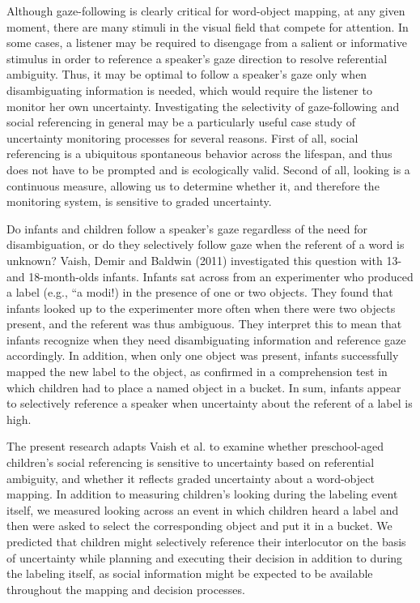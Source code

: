 \documentclass[10pt, letterpaper]{article}
\begin{document}
Although gaze-following is clearly critical for word-object mapping, at
any given moment, there are many stimuli in the visual field that
compete for attention. In some cases, a listener may be required to
disengage from a salient or informative stimulus in order to reference a
speaker's gaze direction to resolve referential ambiguity. Thus, it may
be optimal to follow a speaker's gaze only when disambiguating
information is needed, which would require the listener to monitor her
own uncertainty. Investigating the selectivity of gaze-following and
social referencing in general may be a particularly useful case study of
uncertainty monitoring processes for several reasons. First of all,
social referencing is a ubiquitous spontaneous behavior across the
lifespan, and thus does not have to be prompted and is ecologically
valid. Second of all, looking is a continuous measure, allowing us to
determine whether it, and therefore the monitoring system, is sensitive
to graded uncertainty.

Do infants and children follow a speaker's gaze regardless of the need
for disambiguation, or do they selectively follow gaze when the referent
of a word is unknown? Vaish, Demir and Baldwin (2011) investigated this
question with 13- and 18-month-olds infants. Infants sat across from an
experimenter who produced a label (e.g., ``a modi!) in the presence of
one or two objects. They found that infants looked up to the
experimenter more often when there were two objects present, and the
referent was thus ambiguous. They interpret this to mean that infants
recognize when they need disambiguating information and reference gaze
accordingly. In addition, when only one object was present, infants
successfully mapped the new label to the object, as confirmed in a
comprehension test in which children had to place a named object in a
bucket. In sum, infants appear to selectively reference a speaker when
uncertainty about the referent of a label is high.

The present research adapts Vaish et al. to examine whether
preschool-aged children's social referencing is sensitive to uncertainty
based on referential ambiguity, and whether it reflects graded
uncertainty about a word-object mapping. In addition to measuring
children's looking during the labeling event itself, we measured looking
across an event in which children heard a label and then were asked to
select the corresponding object and put it in a bucket. We predicted
that children might selectively reference their interlocutor on the
basis of uncertainty while planning and executing their decision in
addition to during the labeling itself, as social information might be
expected to be available throughout the mapping and decision processes.
\end{document}
